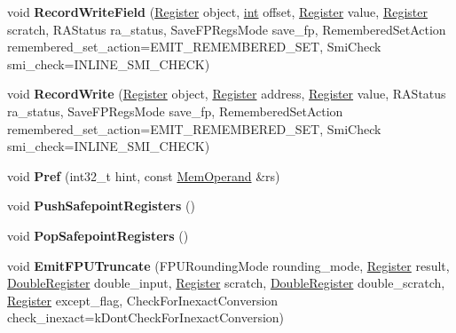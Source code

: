 \begin{DoxyCompactItemize}
void {\bfseries Record\+Write\+Field} (\mbox{\hyperlink{classv8_1_1internal_1_1Register}{Register}} object, \mbox{\hyperlink{classint}{int}} offset, \mbox{\hyperlink{classv8_1_1internal_1_1Register}{Register}} value, \mbox{\hyperlink{classv8_1_1internal_1_1Register}{Register}} scratch, R\+A\+Status ra\+\_\+status, Save\+F\+P\+Regs\+Mode save\+\_\+fp, Remembered\+Set\+Action remembered\+\_\+set\+\_\+action=E\+M\+I\+T\+\_\+\+R\+E\+M\+E\+M\+B\+E\+R\+E\+D\+\_\+\+S\+ET, Smi\+Check smi\+\_\+check=I\+N\+L\+I\+N\+E\+\_\+\+S\+M\+I\+\_\+\+C\+H\+E\+CK)
\item 
\mbox{\label{classv8_1_1internal_1_1MacroAssembler_a54e3055e56df32a38831faf3010e37f8}} 
void {\bfseries Record\+Write} (\mbox{\hyperlink{classv8_1_1internal_1_1Register}{Register}} object, \mbox{\hyperlink{classv8_1_1internal_1_1Register}{Register}} address, \mbox{\hyperlink{classv8_1_1internal_1_1Register}{Register}} value, R\+A\+Status ra\+\_\+status, Save\+F\+P\+Regs\+Mode save\+\_\+fp, Remembered\+Set\+Action remembered\+\_\+set\+\_\+action=E\+M\+I\+T\+\_\+\+R\+E\+M\+E\+M\+B\+E\+R\+E\+D\+\_\+\+S\+ET, Smi\+Check smi\+\_\+check=I\+N\+L\+I\+N\+E\+\_\+\+S\+M\+I\+\_\+\+C\+H\+E\+CK)
\item 
\mbox{\label{classv8_1_1internal_1_1MacroAssembler_ae3c72e87f68dad4e9ea3e6f2d4d66dc7}} 
void {\bfseries Pref} (int32\+\_\+t hint, const \mbox{\hyperlink{classv8_1_1internal_1_1MemOperand}{Mem\+Operand}} \&rs)
\item 
\mbox{\label{classv8_1_1internal_1_1MacroAssembler_aca545d9193d7a468e285a5ba66fb6f19}} 
void {\bfseries Push\+Safepoint\+Registers} ()
\item 
\mbox{\label{classv8_1_1internal_1_1MacroAssembler_accf004371b050ef53eb57724f4d8d8b1}} 
void {\bfseries Pop\+Safepoint\+Registers} ()
\item 
\mbox{\label{classv8_1_1internal_1_1MacroAssembler_af98670774ef916ce9675fbda524feafa}} 
void {\bfseries Emit\+F\+P\+U\+Truncate} (F\+P\+U\+Rounding\+Mode rounding\+\_\+mode, \mbox{\hyperlink{classv8_1_1internal_1_1Register}{Register}} result, \mbox{\hyperlink{classv8_1_1internal_1_1DoubleRegister}{Double\+Register}} double\+\_\+input, \mbox{\hyperlink{classv8_1_1internal_1_1Register}{Register}} scratch, \mbox{\hyperlink{classv8_1_1internal_1_1DoubleRegister}{Double\+Register}} double\+\_\+scratch, \mbox{\hyperlink{classv8_1_1internal_1_1Register}{Register}} except\+\_\+flag, Check\+For\+Inexact\+Conversion check\+\_\+inexact=k\+Dont\+Check\+For\+Inexact\+Conversion)

\end{DoxyCompactItemize}
